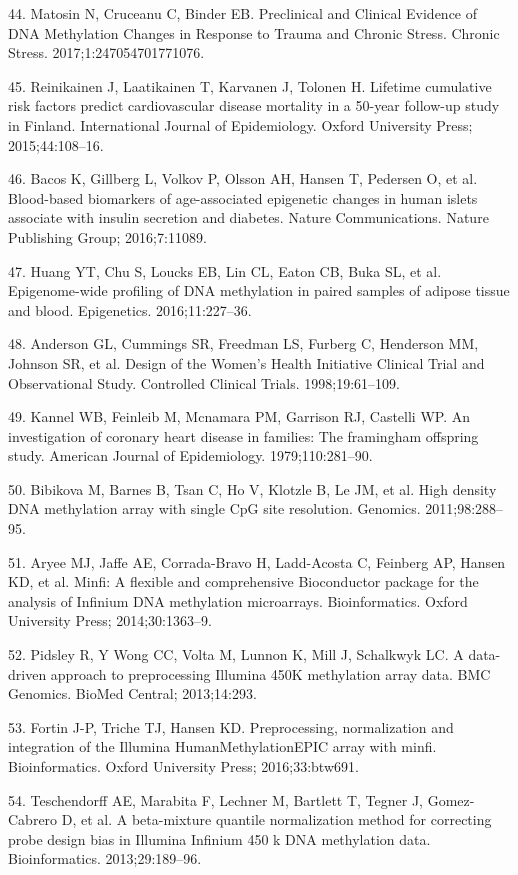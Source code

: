 \documentclass[]{bmcart}
\theoremstyle{definition}
\theoremstyle{definition}
\theoremstyle{definition}
\theoremstyle{remark}
\begin{document}
44. Matosin N, Cruceanu C, Binder EB. Preclinical and Clinical Evidence
of DNA Methylation Changes in Response to Trauma and Chronic Stress.
Chronic Stress. 2017;1:247054701771076.

45. Reinikainen J, Laatikainen T, Karvanen J, Tolonen H. Lifetime
cumulative risk factors predict cardiovascular disease mortality in a
50-year follow-up study in Finland. International Journal of
Epidemiology. Oxford University Press; 2015;44:108--16.

46. Bacos K, Gillberg L, Volkov P, Olsson AH, Hansen T, Pedersen O, et
al. Blood-based biomarkers of age-associated epigenetic changes in human
islets associate with insulin secretion and diabetes. Nature
Communications. Nature Publishing Group; 2016;7:11089.

47. Huang YT, Chu S, Loucks EB, Lin CL, Eaton CB, Buka SL, et al.
Epigenome-wide profiling of DNA methylation in paired samples of adipose
tissue and blood. Epigenetics. 2016;11:227--36.

48. Anderson GL, Cummings SR, Freedman LS, Furberg C, Henderson MM,
Johnson SR, et al. Design of the Women's Health Initiative Clinical
Trial and Observational Study. Controlled Clinical Trials.
1998;19:61--109.

49. Kannel WB, Feinleib M, Mcnamara PM, Garrison RJ, Castelli WP. An
investigation of coronary heart disease in families: The framingham
offspring study. American Journal of Epidemiology. 1979;110:281--90.

50. Bibikova M, Barnes B, Tsan C, Ho V, Klotzle B, Le JM, et al. High
density DNA methylation array with single CpG site resolution. Genomics.
2011;98:288--95.

51. Aryee MJ, Jaffe AE, Corrada-Bravo H, Ladd-Acosta C, Feinberg AP,
Hansen KD, et al. Minfi: A flexible and comprehensive Bioconductor
package for the analysis of Infinium DNA methylation microarrays.
Bioinformatics. Oxford University Press; 2014;30:1363--9.

52. Pidsley R, {Y Wong} CC, Volta M, Lunnon K, Mill J, Schalkwyk LC. A
data-driven approach to preprocessing Illumina 450K methylation array
data. BMC Genomics. BioMed Central; 2013;14:293.

53. Fortin J-P, Triche TJ, Hansen KD. Preprocessing, normalization and
integration of the Illumina HumanMethylationEPIC array with minfi.
Bioinformatics. Oxford University Press; 2016;33:btw691.

54. Teschendorff AE, Marabita F, Lechner M, Bartlett T, Tegner J,
Gomez-Cabrero D, et al. A beta-mixture quantile normalization method for
correcting probe design bias in Illumina Infinium 450 k DNA methylation
data. Bioinformatics. 2013;29:189--96.
\end{document}
